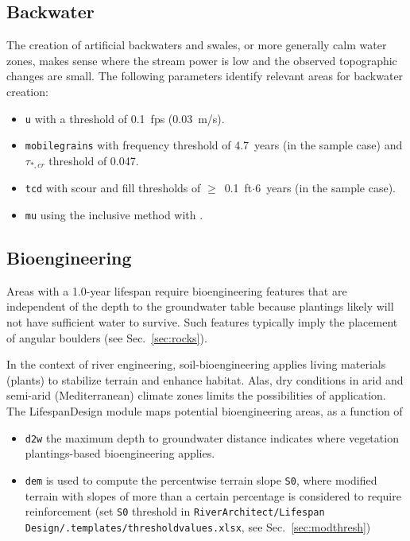 \subsection{Backwater}\label{sec:backwtr}
The creation of artificial backwaters and swales, or more generally calm water zones, makes sense where the stream power is low and the observed topographic changes are small. The following parameters identify relevant areas for backwater creation:
\begin{itemize}
	\item \texttt{u} with a threshold of 0.1~fps (0.03~m/s).
	\item \texttt{mobile{\myUnderscore}grains} with frequency threshold of 4.7~years (in the sample case) and $\tau_{*,cr}$ threshold of 0.047.
	\item \texttt{tcd} with scour and fill thresholds of $\geq$~0.1~ft$\cdot$6~years (in the sample case).
	\item \texttt{mu} using the inclusive method with .
\end{itemize}

\subsection{Bioengineering}\label{sec:bioeng}

Areas with a 1.0-year lifespan require bioengineering features that are independent of the depth to the groundwater table because plantings likely will not have sufficient water to survive. Such features typically imply the placement of angular boulders (see Sec.~\ref{sec:rocks}).

In the context of river engineering, soil-bioengineering applies living materials (plants) to stabilize terrain and enhance habitat. Alas, dry conditions in arid and semi-arid (Mediterranean) climate zones limits the possibilities of application. The LifespanDesign module maps potential bioengineering areas, as a function of
\begin{itemize}
	\item \texttt{d2w} the maximum depth to groundwater distance indicates where vegetation plantings-based bioengineering applies.
	\item \texttt{dem} is used to compute the percentwise terrain slope \texttt{S0}, where modified terrain with slopes of more than a certain percentage is considered to require reinforcement (set \texttt{S0} threshold in \texttt{RiverArchitect/Lifespan Design/.templates/threshold{\myUnderscore}values.xlsx}, see Sec.~\ref{sec:modthresh})
\end{itemize}

